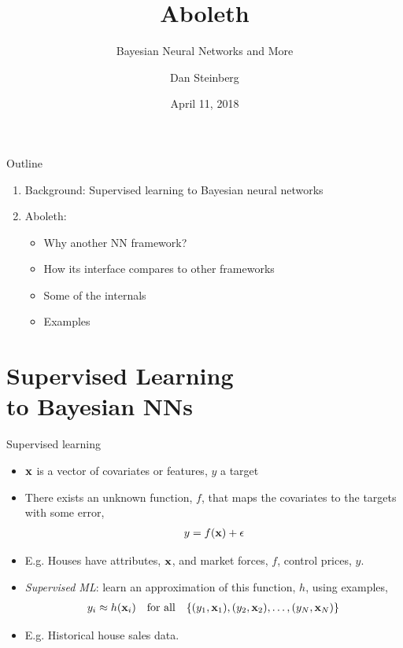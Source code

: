 \documentclass[lualatex, aspectratio=169]{beamer}
\title{Aboleth}
\subtitle{Bayesian Neural Networks and More}
\author{Dan Steinberg}
\date{April 11, 2018}
\institute{Inference Systems Engineering}
\begin{document}
\maketitle

\begin{frame}{Outline}
  \begin{enumerate}
    \item Background: Supervised learning to Bayesian neural networks
    \item Aboleth:
    \begin{itemize}
      \item{Why another NN framework?}
      \item{How its interface compares to other frameworks}
      \item{Some of the internals}
      \item{Examples}
    \end{itemize}
  \end{enumerate}
\end{frame}


\section{Supervised Learning \\ to Bayesian NNs}


\begin{frame}{Supervised learning}
  \begin{itemize}
    \item <1-> $\mathbf{x}$ is a vector of covariates or features, $y$ a target 
    \item <2-> There exists an unknown function, $f$, that maps the covariates to the targets with some error,
      \begin{align*}
        y = f(\mathbf{x}) + \epsilon
      \end{align*}
    \item <3> E.g. Houses have attributes, $\mathbf{x}$, and market forces, $f$, control prices, $y$. 
    \item <4-> \emph{Supervised ML}: learn an approximation of this function, $h$, using examples,
      \begin{align*}
        y_i \approx h(\mathbf{x}_i) \quad \text{for all} \quad \{(y_1, \mathbf{x}_1), (y_2, \mathbf{x}_2), \ldots,
          (y_N, \mathbf{x}_N) \}
      \end{align*}
    \item <5> E.g. Historical house sales data.
  \end{itemize}
\end{frame}
\end{document}
